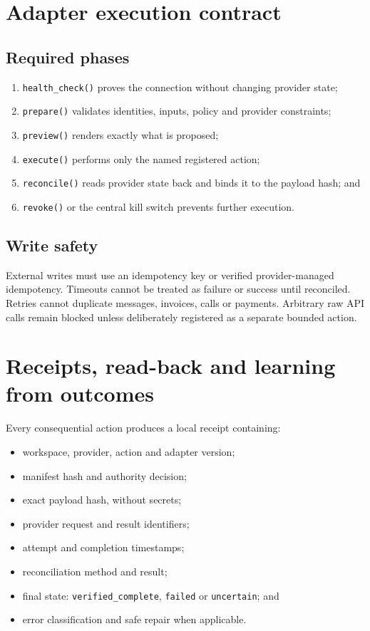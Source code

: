 \documentclass[11pt,a4paper]{article}
\newcommand{\code}[1]{\texttt{#1}}
\begin{document}
\section{Adapter execution contract}

\subsection{Required phases}

\begin{enumerate}
  \item \code{health\_check()} proves the connection without changing provider state;
  \item \code{prepare()} validates identities, inputs, policy and provider constraints;
  \item \code{preview()} renders exactly what is proposed;
  \item \code{execute()} performs only the named registered action;
  \item \code{reconcile()} reads provider state back and binds it to the payload hash; and
  \item \code{revoke()} or the central kill switch prevents further execution.
\end{enumerate}

\subsection{Write safety}

External writes must use an idempotency key or verified provider-managed
idempotency. Timeouts cannot be treated as failure or success until reconciled.
Retries cannot duplicate messages, invoices, calls or payments. Arbitrary raw
API calls remain blocked unless deliberately registered as a separate bounded
action.

\section{Receipts, read-back and learning from outcomes}

Every consequential action produces a local receipt containing:

\begin{itemize}
  \item workspace, provider, action and adapter version;
  \item manifest hash and authority decision;
  \item exact payload hash, without secrets;
  \item provider request and result identifiers;
  \item attempt and completion timestamps;
  \item reconciliation method and result;
  \item final state: \code{verified\_complete}, \code{failed} or \code{uncertain}; and
  \item error classification and safe repair when applicable.
\end{itemize}
\end{document}
